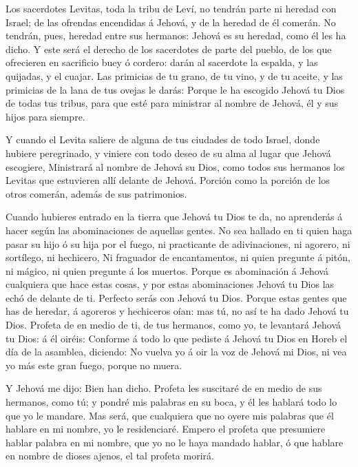  Los sacerdotes Levitas, toda la tribu de Leví, no tendrán
parte ni heredad con Israel; de las ofrendas encendidas á Jehová, y de
la heredad de él comerán.  No tendrán, pues, heredad entre
sus hermanos: Jehová es su heredad, como él les ha dicho.  Y
este será el derecho de los sacerdotes de parte del pueblo, de los que
ofrecieren en sacrificio buey ó cordero: darán al sacerdote la espalda,
y las quijadas, y el cuajar.  Las primicias de tu grano, de
tu vino, y de tu aceite, y las primicias de la lana de tus ovejas le
darás:  Porque le ha escogido Jehová tu Dios de todas tus
tribus, para que esté para ministrar al nombre de Jehová, él y sus hijos
para siempre.

 Y cuando el Levita saliere de alguna de tus ciudades de
todo Israel, donde hubiere peregrinado, y viniere con todo deseo de su
alma al lugar que Jehová escogiere,  Ministrará al nombre de
Jehová su Dios, como todos sus hermanos los Levitas que estuvieren allí
delante de Jehová.  Porción como la porción de los otros
comerán, además de sus patrimonios.

 Cuando hubieres entrado en la tierra que Jehová tu Dios te
da, no aprenderás á hacer según las abominaciones de aquellas gentes.
 No sea hallado en ti quien haga pasar su hijo ó su hija
por el fuego, ni practicante de adivinaciones, ni agorero, ni sortílego,
ni hechicero,  Ni fraguador de encantamentos, ni quien
pregunte á pitón, ni mágico, ni quien pregunte á los muertos.
 Porque es abominación á Jehová cualquiera que hace estas
cosas, y por estas abominaciones Jehová tu Dios las echó de delante de
ti.  Perfecto serás con Jehová tu Dios. 
Porque estas gentes que has de heredar, á agoreros y hechiceros oían:
mas tú, no así te ha dado Jehová tu Dios.  Profeta de en
medio de ti, de tus hermanos, como yo, te levantará Jehová tu Dios: á él
oiréis:  Conforme á todo lo que pediste á Jehová tu Dios en
Horeb el día de la asamblea, diciendo: No vuelva yo á oir la voz de
Jehová mi Dios, ni vea yo más este gran fuego, porque no muera.

 Y Jehová me dijo: Bien han dicho.  Profeta
les suscitaré de en medio de sus hermanos, como tú; y pondré mis
palabras en su boca, y él les hablará todo lo que yo le mandare.
 Mas será, que cualquiera que no oyere mis palabras que él
hablare en mi nombre, yo le residenciaré.  Empero el
profeta que presumiere hablar palabra en mi nombre, que yo no le haya
mandado hablar, ó que hablare en nombre de dioses ajenos, el tal profeta
morirá.


